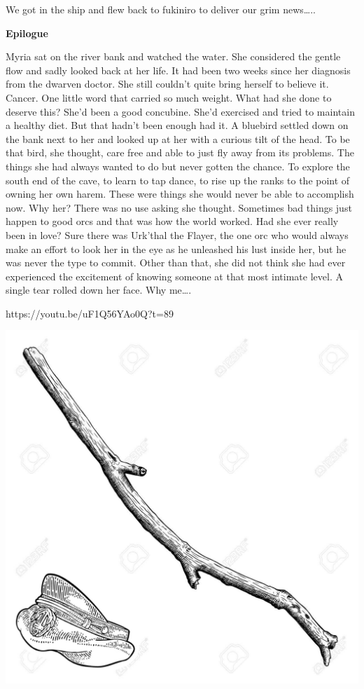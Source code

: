 \begin{multicols}{2}
We got in the ship and flew back to fukiniro to deliver our grim news…..\medskip

\textbf{Epilogue}\medskip

Myria sat on the river bank and watched the water. She considered the gentle flow and sadly looked back at her life. It had been two weeks since her diagnosis from the dwarven doctor. She still couldn’t quite bring herself to believe it. Cancer. One little word that carried so much weight. What had she done to deserve this? She’d been a good concubine. She’d exercised and tried to maintain a healthy diet. But that hadn’t been enough had it. A bluebird settled down on the bank next to her and looked up at her with a curious tilt of the head. To be that bird, she thought, care free and able to just fly away from its problems. The things she had always wanted to do but never gotten the chance. To explore the south end of the cave, to learn to tap dance, to rise up the ranks to the point of owning her own harem. These were things she would never be able to accomplish now. Why her? There was no use asking she thought. Sometimes bad things just happen to good orcs and that was how the world worked. Had she ever really been in love? Sure there was Urk’thal the Flayer, the one orc who would always make an effort to look her in the eye as he unleashed his lust inside her, but he was never the type to commit. Other than that, she did not think she had ever experienced the excitement of knowing someone at that most intimate level. A single tear rolled down her face. Why me….\medskip

https://youtu.be/uF1Q56YAo0Q?t=89\medskip



\end{multicols}

\vspace*{5mm}

\begin{center}
\includegraphics[width=\textwidth]{./content/img/xxx.jpg}
\begin{figure}[h]
\end{figure}
\end{center}

\clearpage